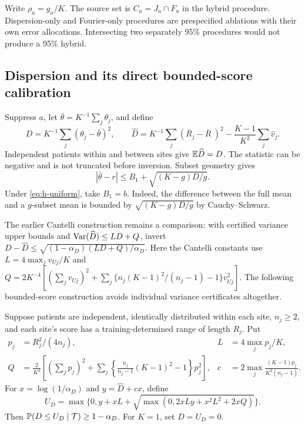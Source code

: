 Write $\rho_a=g_a/K$. The source set is $C_a=J_a\cap F_a$ in the hybrid
procedure. Dispersion-only and Fourier-only procedures are prespecified
ablations with their own error allocations. Intersecting two separately
95\% procedures would not produce a 95\% hybrid.

\subsection{Dispersion and its direct bounded-score calibration}

Suppress $a$, let $\bar\theta=K^{-1}\sum_j\theta_j$, and define
\[
 D=K^{-1}\sum_j(\theta_j-\bar\theta)^2,\qquad
 \widehat D=K^{-1}\sum_j(\bar R_j-\bar R_\cdot)^2
       -\frac{K-1}{K^2}\sum_j\hat v_j.
\]
Independent patients within and between sites give $\mathbb E\widehat D=D$.
The statistic can be negative and is not truncated before inversion.
Subset geometry gives
\begin{equation}
 |\bar\theta-r|\le B_1+\sqrt{(K-g)D/g}.
 \label{eq:h-geometry}
\end{equation}
Under \eqref{eq:h-uniform}, take $B_1=b$.
Indeed, the difference between the full mean and a $g$-subset mean is
bounded by $\sqrt{(K-g)D/g}$ by Cauchy--Schwarz.

The earlier Cantelli construction remains a comparison: with certified
variance upper bounds and $\operatorname{Var}(\widehat D)\le LD+Q$, invert
$D-\widehat D\le\sqrt{(1-\alpha_D)(LD+Q)/\alpha_D}$.
Here the Cantelli constants use $L=4\max_jv_{Uj}/K$ and
$Q=2K^{-4}[(\sum_jv_{Uj})^2+\sum_j\{n_j(K-1)^2/(n_j-1)-1\}v_{Uj}^2]$.
The following bounded-score construction avoids individual variance
certificates altogether.

\begin{proposition}
Suppose patients are independent, identically distributed within each site,
$n_j\ge2$, and each site's score has a training-determined range of length
$R_j$. Put
\begin{align*}
 p_j&=R_j^2/(4n_j),&
 L&=4\max_jp_j/K,\\
 Q&=\frac{2}{K^4}\left[(\sum_jp_j)^2+
 \sum_j\left\{\frac{n_j}{n_j-1}(K-1)^2-1\right\}p_j^2\right],&
 c&=2\max_j\frac{(K-1)p_j}{K^2(n_j-1)}.
\end{align*}
For $x=\log(1/\alpha_D)$ and $y=\widehat D+cx$, define
\[
 U_D=\max\{0,y+xL+\sqrt{\max(0,2xLy+x^2L^2+2xQ)}\}.
\]
Then $\mathbb P(D\le U_D\mid\mathcal T)\ge1-\alpha_D$. For $K=1$, set $D=U_D=0$.
\end{proposition}


